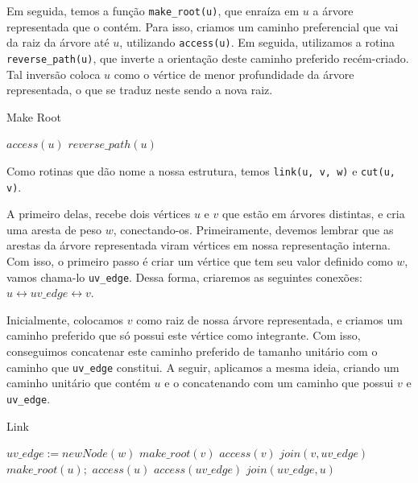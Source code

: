 Em seguida, temos a função \texttt{make\_root(u)}, que enraíza em $u$ a árvore representada que o contém. Para isso, criamos um caminho preferencial que vai da raiz da árvore até $u$, utilizando \texttt{access(u)}. Em seguida, utilizamos a rotina \texttt{reverse\_path(u)}, que inverte a orientação deste caminho preferido recém-criado. Tal inversão coloca $u$ como o vértice de menor profundidade da árvore representada, o que se traduz neste sendo a nova raiz.

\begin{algorithm}[h!]
    \caption{Make Root}\label{lct:make-root}
    \begin{algorithmic}
        \State $access(u)$
        \State $reverse\_path(u)$
        \EndFunction
    \end{algorithmic}
\end{algorithm}

Como rotinas que dão nome a nossa estrutura, temos \texttt{link(u, v, w)} e \texttt{cut(u, v)}.

A primeiro delas, recebe dois vértices $u$ e $v$ que estão em árvores distintas, e cria uma aresta de peso $w$, conectando-os. Primeiramente, devemos lembrar que as arestas da árvore representada viram vértices em nossa representação interna. Com isso, o primeiro passo é criar um vértice que tem seu valor definido como $w$, vamos chama-lo \texttt{uv\_edge}. Dessa forma, criaremos as seguintes conexões: $u \leftrightarrow uv\_edge \leftrightarrow v$.

Inicialmente, colocamos $v$ como raiz de nossa árvore representada, e criamos um caminho preferido que só possui este vértice como integrante. Com isso, conseguimos concatenar este caminho preferido de tamanho unitário com o caminho que \texttt{uv\_edge} constitui. A seguir, aplicamos a mesma ideia, criando um caminho unitário que contém $u$ e o concatenando com um caminho que possui $v$ e \texttt{uv\_edge}.

\begin{algorithm}[h!]
    \caption{Link}\label{lct:link}
    \begin{algorithmic}
        \State $uv\_edge := new Node(w)$ 
        \State {}
        \State $make\_root(v)$
        \State $access(v)$
        \State $join(v, uv\_edge)$
        \State {}
        \State $make\_root(u);$
        \State $access(u)$
        \State $access(uv\_edge)$
        \State $join(uv\_edge, u)$
        \EndFunction
    \end{algorithmic}
\end{algorithm}

